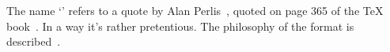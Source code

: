 The name `' refers to a quote by Alan
Perlis~\bibref[Pe:epigrams], quoted on page 365 of the \TeX
book~\bibref[Kn:book]. In a way it's rather pretentious. The philosophy
of the  format is described~.

\endinput

92/10/22 historical remark about name added
92/11/03 section 'Lollipop and plain TeX' added;
         remarks about IniTeX in Textures
92/11/26 uses bibrefs
